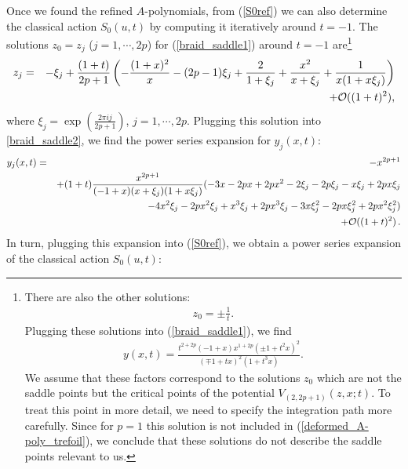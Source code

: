 \documentclass[hyper,letterpaper]{JHEP3}
\begin{document}
Once we found the refined $A$-polynomials, from (\ref{S0ref}) we can also determine
the classical action $S_0(u,t)$ by computing it iteratively around $t=-1$.
The solutions $z_0 = z_j$ ($j=1,\cdots,2p$) for (\ref{braid_saddle1}) around $t=-1$ are\footnote{
There are also the other solutions:
\begin{eqnarray}
z_0=\pm \frac{1}{t}.
\end{eqnarray}
Plugging these solutions into (\ref{braid_saddle1}), we find
\begin{eqnarray}
y(x,t)=\frac{t^{2 + 2 p} (-1 + x) x^{1 + 2 p} (\pm 1 + t^2 x)^2}{(\mp 1 + t x)^2 (1 + t^3 x)}.
\end{eqnarray}
We assume that these factors correspond to the solutions $z_0$ which are
not the saddle points but the critical points of the potential $V_{(2,2p+1)}(z,x;t)$.
To treat this point in more detail, we need to specify the integration path more carefully.
Since for $p=1$ this solution is not included in (\ref{deformed_A-poly_trefoil}),
we conclude that these solutions do not describe the saddle points relevant to us.}
\begin{eqnarray}
z_j&=&-\xi_j+\frac{(1+t)}{2p+1}\left(-\frac{(1+x)^2}{x}-(2p-1)\xi_j+\frac{2}{1+\xi_j}+\frac{x^2}{x+\xi_j}+\frac{1}{x(1+x\xi_j)}\right)
\nonumber \\
&&
+{\cal
 O}((1+t)^2),
\end{eqnarray}
where $\xi_j=\exp(\frac{2\pi ij}{2p+1})$, $j=1,\cdots,2p$.
Plugging this solution into \eqref{braid_saddle2}, we find the power series expansion for $y_j (x,t)$:
\begin{eqnarray}
y_j(x,t)&=&-x^{2p+1} \\
&&
+(1+t)\frac{x^{2p+1}}{(-1+x)(x+\xi_j)(1+x\xi_j)}
(-3 x - 2 p x + 2 p x^2 - 2 \xi_j - 2 p \xi_j - x \xi_j +
 2 p x \xi_j
\nonumber \\
&&\quad\quad\quad\quad\quad\quad\quad\quad\quad
- 4 x^2 \xi_j - 2 p x^2 \xi_j + x^3 \xi_j +
 2 p x^3 \xi_j - 3 x \xi_j^2 - 2 p x \xi_j^2 + 2 p x^2 \xi_j^2)
\nonumber \\
&&+{\cal O}((1+t)^2) \,. \nonumber
\end{eqnarray}
In turn, plugging this expansion into (\ref{S0ref}), we obtain
a power series expansion of the classical action $S_0(u,t)$:
\end{document}
